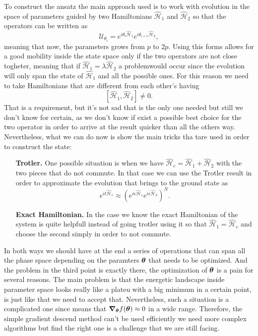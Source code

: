 To construct the ansatz the main approach used is to work with evolution in the space of parameters guided by two Hamiltonians $\hat{\mathcal{H}}_1$ and $\hat{\mathcal{H}}_2$ so that the operators can be written as 
\begin{equation}
    \mathcal{U}_{\theta_i} = e^{i\theta_i\hat{\mathcal{H}}_1}e^{i\theta_{i+1}\hat{\mathcal{H}}_2},
\end{equation}
meaning that now, the parameters grows from $p$ to $2p$. Using this forms allows for a good mobility inside the state space only if the two operators are not close togheter, meaning that if $\hat{\mathcal{H}}_1 = \lambda\hat{\mathcal{H}}_2$ a problemwould occur since the evolution will only span the state of $\hat{\mathcal{H}}_1$ and all the possible ones. For this reason we need to  take Hamiltonians that are different from each other's having
\begin{equation}
    \left[ \hat{\mathcal{H}}_1, \hat{\mathcal{H}}_2 \right] \neq 0.
\end{equation}
That is a requirement, but it's not sad that is the only one needed but still we don't know for certain, as we don't know if exist a possible best choice for the two operator in order to arrive at the result quicker than all the others way. Nevertheless, what we can do now is show the main tricks tha tare used in order to construct the state:
\begin{itemize}[align=left, leftmargin=*]
    \item[\textbf{Trotler.}] One possible situation is when we have $\hat{\mathcal{H}}_c = \hat{\mathcal{H}}_1 + \hat{\mathcal{H}}_2$ with the two pieces that do not commute. In that case we can use the Trotler result in order to approximate the evolution that brings to the ground state as
    \begin{equation}
        e^{it\hat{\mathcal{H}}_c} \approx \left( e^{i\epsilon\hat{\mathcal{H}}_1}e^{i\epsilon\hat{\mathcal{H}}_2} \right)^N.
    \end{equation}
    \item[\textbf{Exact Hamiltonian.}] In the case we know the exact Hamiltonian of the system is quite helpfull instead of going trotler using it so that $\hat{\mathcal{H}}_1 = \hat{\mathcal{H}}_c$ and choose the second simply in order to not commute.
\end{itemize}
In both ways we should have at the end a series of operations that can span all the phase space depending on the paramters $\vb*{\theta}$ that needs to be optimized. And the problem in the third point is exactly there, the optimization of $\vb*{\theta}$ is a pain for several reasons. The main problem is that the energetic landscape inside parameter space looks really like a plateu with a big minimum in a certain point, is just like that we need to accept that. Nevertheless, such a situation is a complicated one since means that $\grad_{\vb*{\theta}} f(\vb*{\theta}) \approx 0$ in a wide range. Therefore, the simple gradient descend method can't be used efficiently we need more complex algorithms but find the right one is a challenge that we are still facing.
